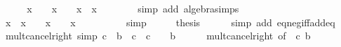 \begin{isabellebody}
%
\isadelimproof
%
\endisadelimproof
%
\isatagproof
{}\isamarkupfalse%
\ {\isacharminus}{\kern0pt}\isanewline
\ \ \isamarkupfalse%
\ {\isachardoublequoteopen}{\isacharparenleft}{\kern0pt}x\ {\isacharminus}{\kern0pt}\ {}{\isacharparenright}{\kern0pt}\ {\isacharasterisk}{\kern0pt}\ {\isacharparenleft}{\kern0pt}x\ {\isacharplus}{\kern0pt}\ {}{\isacharparenright}{\kern0pt}\ {\isacharequal}{\kern0pt}\ x\ {\isacharasterisk}{\kern0pt}\ x\ {\isacharminus}{\kern0pt}\ {}{\isachardoublequoteclose}\isanewline
\ \ \ \ \isamarkupfalse%
\ {\isacharparenleft}{\kern0pt}simp\ add{\isacharcolon}{\kern0pt}\ algebra{\isacharunderscore}{\kern0pt}simps{\isacharparenright}{\kern0pt}\isanewline
\ \ \isamarkupfalse%
\ \isamarkupfalse%
\ {\isachardoublequoteopen}x\ {\isacharasterisk}{\kern0pt}\ x\ {\isacharequal}{\kern0pt}\ {}\ {\isasymlongleftrightarrow}\ {\isacharparenleft}{\kern0pt}x\ {\isacharminus}{\kern0pt}\ {}{\isacharparenright}{\kern0pt}\ {\isacharasterisk}{\kern0pt}\ {\isacharparenleft}{\kern0pt}x\ {\isacharplus}{\kern0pt}\ {}{\isacharparenright}{\kern0pt}\ {\isacharequal}{\kern0pt}\ {}{\isachardoublequoteclose}\isanewline
\ \ \ \ \isamarkupfalse%
\ simp\isanewline
\ \ \isamarkupfalse%
\ \isamarkupfalse%
\ {\isacharquery}{\kern0pt}thesis\isanewline
\ \ \ \ \isamarkupfalse%
\ {\isacharparenleft}{\kern0pt}simp\ add{\isacharcolon}{\kern0pt}\ eq{\isacharunderscore}{\kern0pt}neg{\isacharunderscore}{\kern0pt}iff{\isacharunderscore}{\kern0pt}add{\isacharunderscore}{\kern0pt}eq{\isacharunderscore}{\kern0pt}{}{\isacharparenright}{\kern0pt}\isanewline
{}\isamarkupfalse%
%
\endisatagproof
{\isafoldproof}%
%
\isadelimproof
\isanewline
%
\endisadelimproof
\isanewline
{}\isamarkupfalse%
\ mult{\isacharunderscore}{\kern0pt}cancel{\isacharunderscore}{\kern0pt}right{}\ {\isacharbrackleft}{\kern0pt}simp{\isacharbrackright}{\kern0pt}{\isacharcolon}{\kern0pt}\ {\isachardoublequoteopen}c\ {\isacharequal}{\kern0pt}\ b\ {\isacharasterisk}{\kern0pt}\ c\ {\isasymlongleftrightarrow}\ c\ {\isacharequal}{\kern0pt}\ {}\ {\isasymor}\ b\ {\isacharequal}{\kern0pt}\ {}{\isachardoublequoteclose}\isanewline
%
\isadelimproof
\ \ %
\endisadelimproof
%
\isatagproof
{}\isamarkupfalse%
\ mult{\isacharunderscore}{\kern0pt}cancel{\isacharunderscore}{\kern0pt}right\ {\isacharbrackleft}{\kern0pt}of\ {}\ c\ b{\isacharbrackright}{\kern0pt}\ \isamarkupfalse%

\end{isabellebody}
